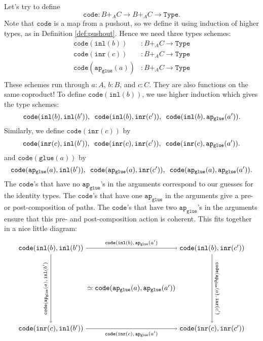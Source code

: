 \documentclass[12pt]{amsart}
\newcommand{\from}{\colon}
\newcommand{\tin}{\colon}
\newcommand{\type}[1]{\mathtt{#1}}
\newcommand{\Type}{\type{Type}}
\newcommand{\inl}{\type{inl}}
\newcommand{\inr}{\type{inr}}
\newcommand{\glue}{\type{glue}}
\newcommand{\code}{\type{code}}
\theoremstyle{remark}
\theoremstyle{definition}
\begin{document}
Let's try to define 
\[
	\code \from 
	B +_A C \to B +_A C \to \Type.
\]  
Note that $\code$ is a map from a pushout, 
so we define it using induction of higher types, 
as in Definition \ref{def:pushout}.
Hence we need three types schemes:
\begin{align*}
	\code(\inl(b)) & \from B +_A C \to \Type \\
	\code(\inr(c)) & \from B +_A C \to \Type \\
	\code(\type{ap_{glue}}(a)) & \from B +_A C \to \Type \\
\end{align*}
These schemes run through 
$a \tin A$, $b \tin B$, and $c \tin C$.  
They are also functions on the same coproduct!
To define $\code(\inl(b))$, 
we use higher induction which gives the type schemes:
\[
	\code(\inl(b),\inl(b')), \hspace{0.5em}
	\code(\inl(b),\inr(c')), \hspace{0.5em}
	\code(\inl(b),\type{ap_{glue}}(a')).
\]
Similarly, we define $\code(\inr(c))$ by
\[
	\code(\inr(c),\inl(b')), \hspace{0.5em}
	\code(\inr(c),\inr(c')) , \hspace{0.5em}
	\code(\inr(c),\type{ap_{glue}}(a')).
\]
and $\code(\glue(a))$ by 
\[
	\code(\type{ap_{glue}}(a),\inl(b')), \hspace{0.5em}
	\code(\type{ap_{glue}}(a),\inr(c')) , \hspace{0.5em} 
	\code(\type{ap_{glue}}(a),\type{ap_{glue}}(a')).
\]
The $\code$'s that have 
no $\type{ap_{glue}}$'s in the arguments 
correspond to our guesses
for the identity types.
The $\code$'s that have 
one $\type{ap_{glue}}$ in the arguments
give a pre- or post-composition
of paths.
The $\code$'s that have 
two $\type{ap_{glue}}$'s in the arguments  
ensure that this pre- and post-composition
action is coherent.
This fits together in a nice little 
diagram:
\[ %
	\begin{tikzpicture}
		\node (AA) at (0,0) 
			{ $ \simeq \type{ code } ( \type{ ap_{glue} } ( a ) , \type{ ap_{glue} } ( a' )  )$ }; 
		\node (BB) at (-4,2) 
			{ $ \type{ code } ( \type{ inl } ( b ) , \type{ inl } ( b' )  )$ }; 
		\node (BC) at (4,2) 
			{ $ \type{ code } ( \type{ inl } ( b ) , \type{ inr } ( c' )  )$ }; 
		\node (CB) at (-4,-2) 
			{ $ \type{ code } ( \type{ inr } ( c ) , \type{ inl } ( b' )  )$ }; 
		\node (CC) at (4,-2) 
			{ $ \type{ code } ( \type{ inr } ( c ) , \type{ inr } ( c' )  )$ }; 
		\draw [->] (BB) to 
			node 
				[above] 
				{\scriptsize $ \type{ code } ( \type{ inl } ( b ) , \type{ ap_{glue} } ( a' ) $ } 
			(BC);
		\draw [->] (BB) to 	
			node 
				[rotate=90,above] 
				{ \scriptsize $ \type{ code } ( \type{ ap_{glue} } ( a ) , \type{ inl } ( b' ) $ } 
			(CB);
		\draw [->] (BC) to 
			node 
				[rotate=-90, above] 
				{\scriptsize $\type{ code } ( \type{ ap_{glue} } ( a ) , \type{ inr } ( c' ) $} 
			(CC);
		\draw [->] (CB) to 	
			node 
				[below] 
				{ \scriptsize $ \type{ code } ( \type{ inr } ( c ) , \type{ ap_{glue} } ( a' ) $ } 
			(CC);
	\end{tikzpicture}
\]
\end{document}
